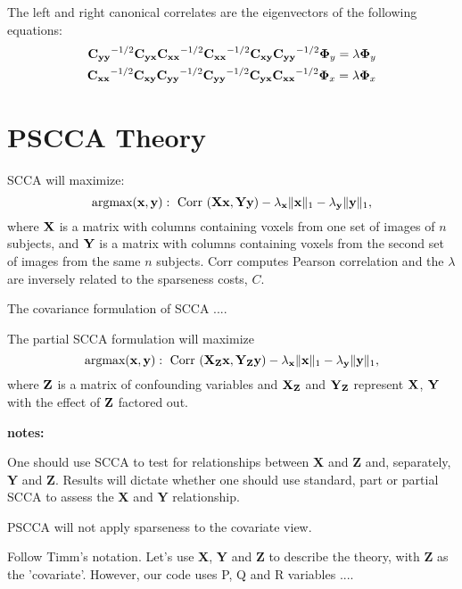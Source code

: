 \documentclass{llncs}
\newcommand{\X}{{\bf X}}
\newcommand{\x}{{\bf x}}
\newcommand{\Y}{{\bf Y}}
\newcommand{\y}{{\bf y}}
\newcommand{\Z}{{\bf Z}}
\begin{document}
The left and right canonical correlates are
the eigenvectors of the following equations:
\begin{eqnarray}
\label{eigvecs}
\nonumber
{\bf C_{yy}}^{-1/2}{\bf C_{yx}}{\bf C_{xx}}^{-1/2}{\bf C_{xx}}^{-1/2}{\bf C_{xy}}{\bf C_{yy}}^{-1/2}{\boldsymbol\Phi_y} = \lambda {\boldsymbol\Phi_y} \\
{\bf C_{xx}}^{-1/2}{\bf C_{xy}}{\bf C_{yy}}^{-1/2}{\bf C_{yy}}^{-1/2}{\bf C_{yx}}{\bf C_{xx}}^{-1/2}{\boldsymbol\Phi_x} = \lambda {\boldsymbol\Phi_x}
\end{eqnarray}





\section{PSCCA Theory}
SCCA will maximize:
\begin{equation}
\text{argmax}( \x,\y) :
~\text{Corr}~( \X \x , \Y \y) - \lambda_\x \| \x \|_1 - \lambda_\y \|  \y  \|_1 , 
\end{equation} 
where $\X$ is a matrix with columns containing voxels from one set of
images of $n$ subjects, 
and $\Y$ is a matrix with columns containing voxels from the second
set of images from the same $n$ subjects. 
Corr computes Pearson correlation and the
$\lambda$ are inversely related to the sparseness costs, $C$.  %

The covariance formulation of SCCA .... 

The partial SCCA formulation will maximize 
\begin{equation}
\text{argmax}( \x,\y) :
~\text{Corr}~( \X_{\Z} \x , \Y_{\Z} \y) - \lambda_\x \| \x \|_1 - \lambda_\y \|  \y  \|_1 , 
\end{equation} 
where $\Z$ is a matrix of confounding variables and $\X_{\Z}$ and
$\Y_{\Z}$ represent $\X$, $\Y$ with the effect of $\Z$ factored out.

{\bf notes:}

One should use SCCA to test for relationships between {\X} and {\Z} and, separately, {\Y} and {\Z}.  Results will dictate whether
one should use standard, part or partial SCCA to assess the {\X} and {\Y}
relationship.

PSCCA will not apply sparseness to the covariate view.  

Follow Timm's notation.  Let's use {\X}, {\Y} and {\Z} to describe the theory, with {\Z} as the
'covariate'.   However, our code uses P, Q and R variables ....
 
\end{document}

